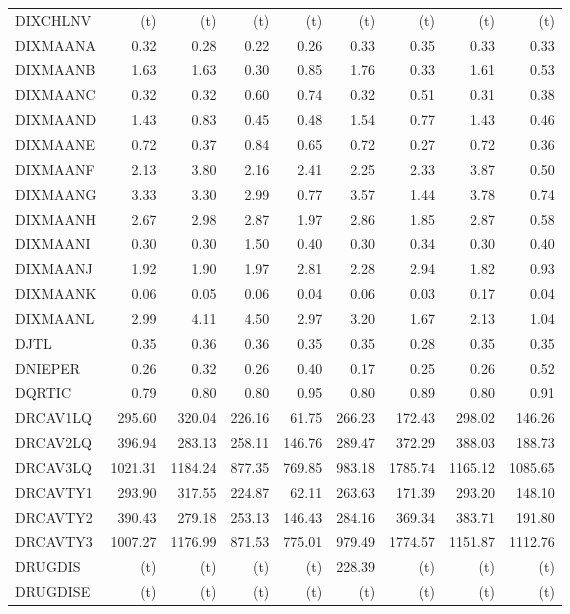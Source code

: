 \documentclass[11pt,twoside]{article}
\begin{document}
{\begin{longtable}[c]{|l|r|r|r|r|r|r|r|r|}
DIXCHLNV & (t) & (t) & (t) & (t) & (t) & (t) & (t) & (t) \\
DIXMAANA & 0.32 & 0.28 & 0.22 & 0.26 & 0.33 & 0.35 & 0.33 & 0.33 \\
DIXMAANB & 1.63 & 1.63 & 0.30 & 0.85 & 1.76 & 0.33 & 1.61 & 0.53 \\
DIXMAANC & 0.32 & 0.32 & 0.60 & 0.74 & 0.32 & 0.51 & 0.31 & 0.38 \\
DIXMAAND & 1.43 & 0.83 & 0.45 & 0.48 & 1.54 & 0.77 & 1.43 & 0.46 \\
DIXMAANE & 0.72 & 0.37 & 0.84 & 0.65 & 0.72 & 0.27 & 0.72 & 0.36 \\
DIXMAANF & 2.13 & 3.80 & 2.16 & 2.41 & 2.25 & 2.33 & 3.87 & 0.50 \\
DIXMAANG & 3.33 & 3.30 & 2.99 & 0.77 & 3.57 & 1.44 & 3.78 & 0.74 \\
DIXMAANH & 2.67 & 2.98 & 2.87 & 1.97 & 2.86 & 1.85 & 2.87 & 0.58 \\
DIXMAANI & 0.30 & 0.30 & 1.50 & 0.40 & 0.30 & 0.34 & 0.30 & 0.40 \\
DIXMAANJ & 1.92 & 1.90 & 1.97 & 2.81 & 2.28 & 2.94 & 1.82 & 0.93 \\
DIXMAANK & 0.06 & 0.05 & 0.06 & 0.04 & 0.06 & 0.03 & 0.17 & 0.04 \\
DIXMAANL & 2.99 & 4.11 & 4.50 & 2.97 & 3.20 & 1.67 & 2.13 & 1.04 \\
DJTL & 0.35 & 0.36 & 0.36 & 0.35 & 0.35 & 0.28 & 0.35 & 0.35 \\
DNIEPER & 0.26 & 0.32 & 0.26 & 0.40 & 0.17 & 0.25 & 0.26 & 0.52 \\
DQRTIC & 0.79 & 0.80 & 0.80 & 0.95 & 0.80 & 0.89 & 0.80 & 0.91 \\
DRCAV1LQ & 295.60 & 320.04 & 226.16 & 61.75 & 266.23 & 172.43 & 298.02 & 146.26 \\
DRCAV2LQ & 396.94 & 283.13 & 258.11 & 146.76 & 289.47 & 372.29 & 388.03 & 188.73 \\
DRCAV3LQ & 1021.31 & 1184.24 & 877.35 & 769.85 & 983.18 & 1785.74 & 1165.12 & 1085.65 \\
DRCAVTY1 & 293.90 & 317.55 & 224.87 & 62.11 & 263.63 & 171.39 & 293.20 & 148.10 \\
DRCAVTY2 & 390.43 & 279.18 & 253.13 & 146.43 & 284.16 & 369.34 & 383.71 & 191.80 \\
DRCAVTY3 & 1007.27 & 1176.99 & 871.53 & 775.01 & 979.49 & 1774.57 & 1151.87 & 1112.76 \\
DRUGDIS & (t) & (t) & (t) & (t) & 228.39 & (t) & (t) & (t) \\
DRUGDISE & (t) & (t) & (t) & (t) & (t) & (t) & (t) & (t) \\

\end{longtable}}
\end{document}

